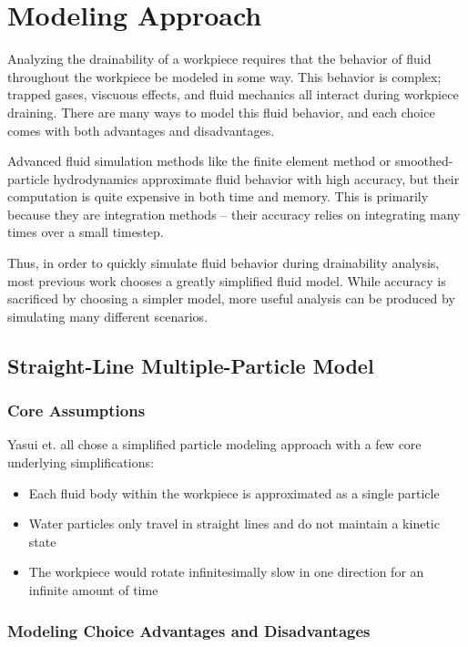 						\chapter{Modeling Approach}

Analyzing the drainability of a workpiece requires that the behavior of fluid throughout the workpiece be modeled in some way. This behavior is complex; trapped gases, viscuous effects, and fluid mechanics all interact during workpiece draining. There are many ways to model this fluid behavior, and each choice comes with both advantages and disadvantages.

Advanced fluid simulation methods like the finite element method or smoothed-particle hydrodynamics approximate fluid behavior with high accuracy, but their computation is quite expensive in both time and memory. This is primarily because they are integration methods -- their accuracy relies on integrating many times over a small timestep.

Thus, in order to quickly simulate fluid behavior during drainability analysis, most previous work chooses a greatly simplified fluid model. While accuracy is sacrificed by choosing a simpler model, more useful analysis can be produced by simulating many different scenarios.

\section{Straight-Line Multiple-Particle Model}


	\subsection{Core Assumptions}

Yasui et. all \cite{plot} chose a simplified particle modeling approach with a few core underlying simplifications:

\begin{itemize}
	\item Each fluid body within the workpiece is approximated as a single particle
	\item Water particles only travel in straight lines and do not maintain a kinetic state
	\item The workpiece would rotate infinitesimally slow in one direction for an infinite amount of time
\end{itemize}

	\subsection{Modeling Choice Advantages and Disadvantages}


